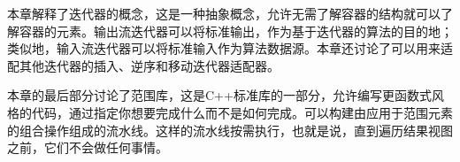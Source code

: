 本章解释了迭代器的概念，这是一种抽象概念，允许无需了解容器的结构就可以了解容器的元素。输出流迭代器可以将标准输出，作为基于迭代器的算法的目的地；类似地，输入流迭代器可以将标准输入作为算法数据源。本章还讨论了可以用来适配其他迭代器的插入、逆序和移动迭代器适配器。

本章的最后部分讨论了范围库，这是C++标准库的一部分，允许编写更函数式风格的代码，通过指定你想要完成什么而不是如何完成。可以构建由应用于范围元素的组合操作组成的流水线。这样的流水线按需执行，也就是说，直到遍历结果视图之前，它们不会做任何事情。
